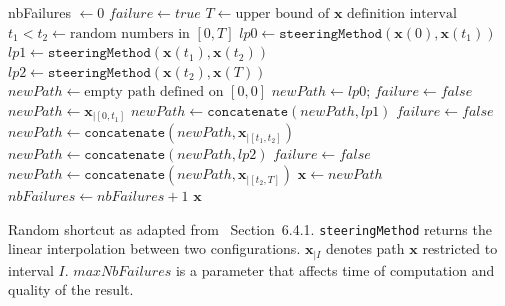 \documentclass{tADR2e}
\newcommand\xx{\mathbf{x}} %
\begin{document}
\begin{algorithm}
\begin{algorithmic}[1] %
\Procedure{randomShortcut}{$\xx$}
   \State nbFailures $\gets 0$
        \State $failure \gets true$
        \State $T \gets \mbox{upper bound of }\xx\mbox{ definition interval}$
        \State $t_1 < t_2 \gets \mbox{random numbers in }[0,T]$
        \State $lp0 \gets \texttt{steeringMethod} (\xx(0), \xx(t_1))$
        \State $lp1 \gets \texttt{steeringMethod} (\xx(t_1), \xx(t_2))$
        \State $lp2 \gets \texttt{steeringMethod} (\xx(t_2), \xx(T))$
        \State $newPath \gets \mbox{empty path defined on }[0,0]$
          \State $newPath \gets lp0$; $failure \gets false$
        \Else
          \State $newPath \gets \xx_{|[0,t_1]}$
        \EndIf
          \State $newPath \gets \texttt{concatenate} (newPath, lp1)$
          \State $failure \gets false$
        \Else
          \State $newPath \gets \texttt{concatenate} (newPath, \xx_{|[t_1,t_2]})$
        \EndIf
          \State $newPath \gets \texttt{concatenate} (newPath, lp2)$
          \State $failure \gets false$
        \Else
          \State $newPath \gets \texttt{concatenate} (newPath, \xx_{|[t_2,T]})$
        \EndIf
        \State $\xx \gets newPath$
         $nbFailures \gets nbFailures + 1$
        \EndIf
      \EndWhile
    \Return $\xx$
\EndProcedure
\end{algorithmic}
\caption{Random shortcut as adapted from~\cite{Sekhavat-Svestka1998} 
Section~6.4.1. \texttt{steeringMethod} returns the linear interpolation between 
two configurations. $\xx_{|I}$ denotes path $\xx$ restricted to interval $I$. 
$maxNbFailures$ is a parameter that affects time of computation and quality of 
the result.}\label{algo:random-shortcut}
\end{algorithm}
\end{document}
